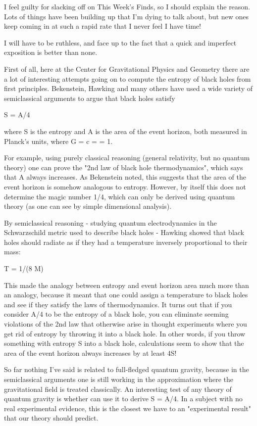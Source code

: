 


I feel guilty for slacking off on This Week's Finds, so I should
explain the reason.  Lots of things have been building up that I'm
dying to talk about, but new ones keep coming in at such a rapid rate
that I never feel I have time!

I will have to be ruthless, and face up to the fact that a quick and
imperfect exposition is better than none.

First of all, here at the Center for Gravitational Physics and 
Geometry there are a lot of interesting attempts going on to compute
the entropy of black holes from first principles.   Bekenstein, 
Hawking and many others have used a wide variety of semiclassical arguments 
to argue that black holes satisfy

S = A/4

where S is the entropy and A is the area of the event horizon, both
measured in Planck's units, where G = c = \hbar  = 1.  

For example, using purely classical reasoning (general relativity, but
no quantum theory) one can prove the "2nd law of black hole
thermodynamics", which says that A always increases.  As Bekenstein
noted, this suggests that the area of the event horizon is somehow
analogous to entropy.  However, by itself this does not determine 
the magic number 1/4, which can only be derived using quantum theory
(as one can see by simple dimensional analysis).

By semiclassical reasoning - studying quantum electrodynamics in
the Schwarzschild metric used to describe black holes - Hawking showed
that black holes should radiate as if they had a temperature inversely
proportional to their mass:

T = 1/(8 \pi  M)

This made the analogy between entropy and event horizon area much more
than an analogy, because it meant that one could assign a temperature
to black holes and see if they satisfy the laws of thermodynamics.  It
turns out that if you consider A/4 to be the entropy of a black hole,
you can eliminate seeming violations of the 2nd law that otherwise
arise in thought experiments where you get rid of entropy by throwing
it into a black hole.  In other words, if you throw something with
entropy S into a black hole, calculations seem to show that the area
of the event horizon always increases by at least 4S!

So far nothing I've said is related to full-fledged quantum gravity,
because in the semiclassical arguments one is still working in the
approximation where the gravitational field is treated classically.
An interesting test of any theory of quantum gravity is whether can use
it to derive S = A/4.  In a subject with no real experimental evidence,
this is the closest we have to an "experimental result" that our theory
should predict.


